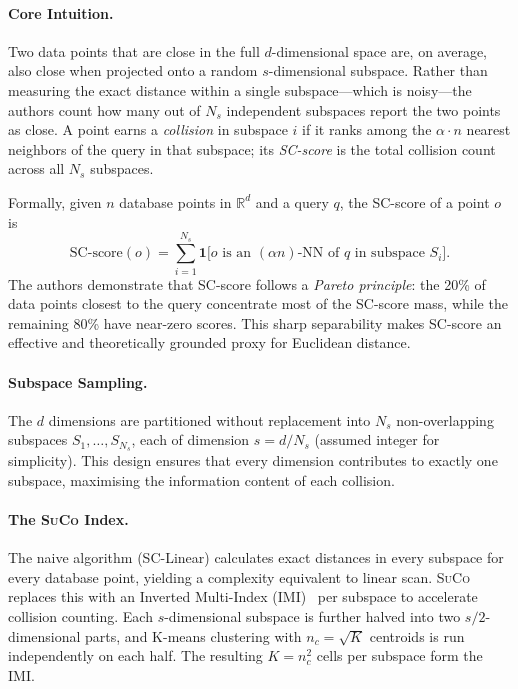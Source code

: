 \documentclass[11pt,a4paper]{article}
\newcommand{\suco}{\textsc{SuCo}}
\newcommand{\NS}{N_s}
\newcommand{\nc}{n_c}
\begin{document}
\paragraph{Core Intuition.}
Two data points that are close in the full $d$-dimensional space are, on
average, also close when projected onto a random $s$-dimensional subspace.
Rather than measuring the exact distance within a single subspace---which is
noisy---the authors count how many out of $\NS$ independent subspaces report
the two points as close.  A point earns a \emph{collision} in subspace $i$
if it ranks among the $\alpha \cdot n$ nearest neighbors of the query in
that subspace; its \emph{SC-score} is the total collision count across all
$\NS$ subspaces.

Formally, given $n$ database points in $\mathbb{R}^d$ and a query $q$, the
SC-score of a point $o$ is
\[
  \text{SC-score}(o) = \sum_{i=1}^{\NS} \mathbf{1}\bigl[o \text{ is an }
  (\alpha n)\text{-NN of } q \text{ in subspace } S_i\bigr].
\]
The authors demonstrate that SC-score follows a \emph{Pareto principle}: the
20\% of data points closest to the query concentrate most of the SC-score
mass, while the remaining 80\% have near-zero scores.  This sharp separability
makes SC-score an effective and theoretically grounded proxy for Euclidean
distance.

\paragraph{Subspace Sampling.}
The $d$ dimensions are partitioned without replacement into $\NS$
non-overlapping subspaces $S_1, \ldots, S_{\NS}$, each of dimension
$s = d / \NS$ (assumed integer for simplicity).  This design ensures that
every dimension contributes to exactly one subspace, maximising the information
content of each collision.

\paragraph{The \suco{} Index.}
The naive algorithm (SC-Linear) calculates exact distances in every subspace
for every database point, yielding a complexity equivalent to linear scan.
\suco{} replaces this with an Inverted Multi-Index (IMI)~\cite{babenko2014imi}
per subspace to accelerate collision counting.  Each $s$-dimensional subspace
is further halved into two $s/2$-dimensional parts, and K-means clustering
with $\nc = \sqrt{K}$ centroids is run independently on each half.  The
resulting $K = \nc^2$ cells per subspace form the IMI.
\end{document}
